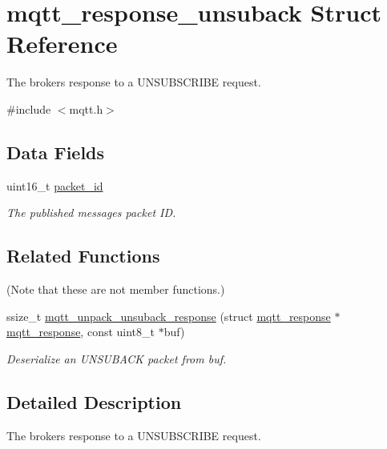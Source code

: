 \hypertarget{structmqtt__response__unsuback}{}\section{mqtt\+\_\+response\+\_\+unsuback Struct Reference}
\label{structmqtt__response__unsuback}


The brokers response to a U\+N\+S\+U\+B\+S\+C\+R\+I\+BE request.  




{\ttfamily \#include $<$mqtt.\+h$>$}

\subsection*{Data Fields}
\begin{DoxyCompactItemize}
\item 
uint16\+\_\+t \hyperlink{structmqtt__response__unsuback_a7be9284cfc5e4b1ea8ae310b6bef5393}{packet\+\_\+id}\hypertarget{structmqtt__response__unsuback_a7be9284cfc5e4b1ea8ae310b6bef5393}{}\label{structmqtt__response__unsuback_a7be9284cfc5e4b1ea8ae310b6bef5393}

\begin{DoxyCompactList}\small\item\em The published messages packet ID. \end{DoxyCompactList}\end{DoxyCompactItemize}
\subsection*{Related Functions}
(Note that these are not member functions.) \begin{DoxyCompactItemize}
\item 
ssize\+\_\+t \hyperlink{structmqtt__response__unsuback_af47bfa86aab0876c6855edad4d1bbbc0}{mqtt\+\_\+unpack\+\_\+unsuback\+\_\+response} (struct \hyperlink{structmqtt__response}{mqtt\+\_\+response} $\ast$\hyperlink{structmqtt__response}{mqtt\+\_\+response}, const uint8\+\_\+t $\ast$buf)
\begin{DoxyCompactList}\small\item\em Deserialize an U\+N\+S\+U\+B\+A\+CK packet from {\ttfamily buf}. \end{DoxyCompactList}\end{DoxyCompactItemize}


\subsection{Detailed Description}
The brokers response to a U\+N\+S\+U\+B\+S\+C\+R\+I\+BE request. 

